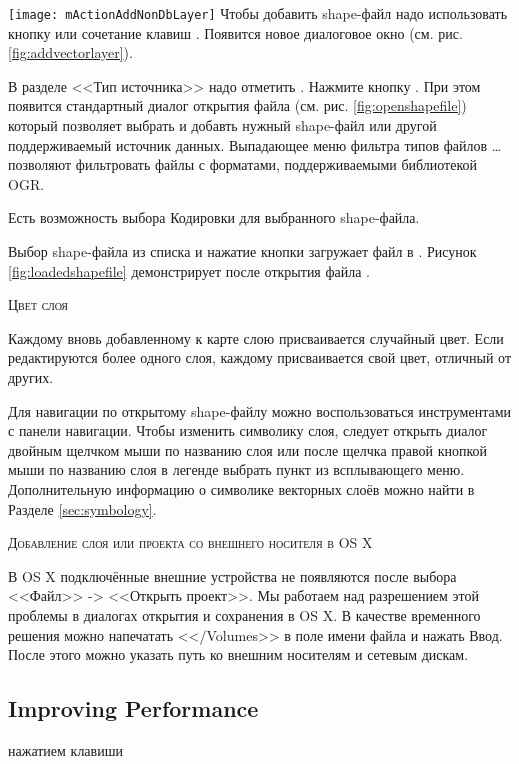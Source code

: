 \texttt{[image: mActionAddNonDbLayer]} Чтобы добавить shape-файл
надо использовать кнопку 
 или сочетание клавиш .
Появится новое диалоговое окно (см. рис. \ref{fig:addvectorlayer}).

В разделе <<Тип источника>> надо отметить . Нажмите кнопку .
При этом появится стандартный диалог открытия файла (см. рис.
\ref{fig:openshapefile}) который позволяет выбрать и добавть нужный shape-файл
или другой поддерживаемый источник данных.
Выпадающее меню фильтра типов файлов \ldots позволяют фильтровать файлы с форматами, поддерживаемыми библиотекой OGR.

Есть возможность выбора Кодировки для выбранного shape-файла.

Выбор shape-файла из списка и нажатие кнопки  загружает файл в \qg. Рисунок
\ref{fig:loadedshapefile} демонстрирует \qg после открытия файла .


\begin{Tip}\caption{\textsc{Цвет слоя}}
Каждому вновь добавленному к карте слою присваивается случайный цвет.
Если редактируются более одного слоя, каждому присваивается свой цвет, отличный от других.
\end{Tip}

Для навигации по открытому shape-файлу можно воспользоваться инструментами с панели навигации.
Чтобы изменить символику слоя, следует открыть диалог  двойным щелчком мыши
по названию слоя или после щелчка правой кнопкой мыши по названию слоя в легенде
выбрать пункт  из всплывающего меню. Дополнительную информацию
о символике векторных слоёв можно найти в Разделе \ref{sec:symbology}.

\begin{Tip}\caption{\textsc{Добавление слоя или проекта со внешнего носителя в OS X}}
В OS X подключённые внешние устройства
не появляются после выбора <<Файл>> -> <<Открыть проект>>. Мы работаем
над разрешением этой проблемы в диалогах открытия и сохранения в OS X. В качестве временного решения
можно напечатать <</Volumes>> в поле имени файла и нажать Ввод. После этого можно указать путь ко внешним носителям и сетевым дискам.
\end{Tip}

\subsection{Improving Performance}нажатием клавиши

